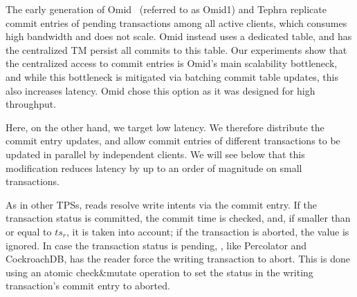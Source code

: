 %
The early generation of Omid~\cite{OmidICDE2014} (referred to as Omid1) and Tephra replicate commit entries 
of pending transactions among all active clients, which consumes high bandwidth and does not scale. Omid 
instead uses a dedicated table, and 
has the centralized TM persist all commits to this table. 
Our experiments show that the centralized access to commit entries is Omid's main scalability bottleneck, 
and while this bottleneck is mitigated via batching commit table updates, this also increases latency.
Omid chose this  option as it was designed for high throughput. 

Here, on the other hand, we target  low latency. 
We therefore distribute the commit entry updates, and allow commit entries of different transactions to be 
updated in parallel by independent clients. We will see below that this modification reduces latency
by up to an order of magnitude on small transactions.


As in other TPSs, reads resolve write intents via the commit entry.
If the transaction status is committed, the commit time is checked, and, if smaller than or equal to $ts_r$, it is taken into account;
if the transaction is aborted, the value is ignored.
In case the transaction status is pending, \sys, like Percolator and CockroachDB, has the reader
force the writing transaction to abort. This is done using an atomic check\&mutate operation to set the status in the
writing transaction's commit entry to aborted.

